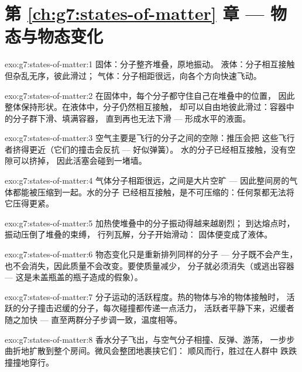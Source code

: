 \section*{第 \ref{ch:g7:states-of-matter} 章 --- 物态与物态变化}

\begin{solution}{exo:g7:states-of-matter:1}
固体：分子整齐堆叠，原地振动。
液体：分子相互接触但杂乱无序，彼此滑过；
气体：分子相距很远，向各个方向快速飞动。
\end{solution}

\begin{solution}{exo:g7:states-of-matter:2}
在固体中，每个分子都守住自己在堆叠中的位置，
因此整体保持形状。在液体中，分子仍然相互接触，
却可以自由地彼此滑过：容器中的分子群下滑、填满容器，
直到再也无法下滑 --- 形成水平的液面。
\end{solution}

\begin{solution}{exo:g7:states-of-matter:3}
空气主要是飞行的分子之间的空隙：推压会把
这些飞行者挤得更近（它们的撞击会反抗 --- 好似弹簧）。
水的分子已经相互接触，没有空隙可以挤掉，
因此活塞会碰到一堵墙。
\end{solution}

\begin{solution}{exo:g7:states-of-matter:4}
气体分子相距很远，之间是大片空旷 ---
因此整间房的气体都能被压缩到一起。水的分子
已经相互接触，是不可压缩的：任何泵都无法将它压得更紧。
\end{solution}

\begin{solution}{exo:g7:states-of-matter:5}
加热使堆叠中的分子振动得越来越剧烈；
到达熔点时，振动压倒了堆叠的束缚，
行列瓦解，分子开始滑动：
固体便变成了液体。
\end{solution}

\begin{solution}{exo:g7:states-of-matter:6}
物态变化只是重新排列同样的分子 --- 分子既不会产生，
也不会消失，因此质量不会改变。要使质量减少，
分子就必须消失（或逃出容器 ---
这是未盖瓶盖的瓶子造成的假象）。
\end{solution}

\begin{solution}{exo:g7:states-of-matter:7}
分子运动的活跃程度。热的物体与冷的物体接触时，
活跃的分子撞击迟缓的分子，每次碰撞都传递一点活力，
活跃者平静下来，迟缓者随之加快 ---
直至两群分子步调一致，温度相等。
\end{solution}

\begin{solution}{exo:g7:states-of-matter:8}
香水分子飞出，与空气分子相撞、反弹、游荡，
一步步曲折地扩散到整个房间。微风会整团地裹挟它们：
顺风而行，胜过在人群中
跌跌撞撞地穿行。
\end{solution}

